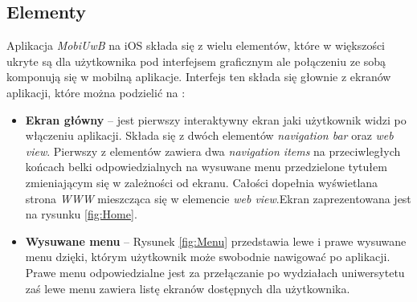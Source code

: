 \documentclass{iiuwb}
\begin{document}
\subsection{Elementy}
Aplikacja \textit{MobiUwB} na iOS składa się z wielu elementów, które w większości ukryte są dla użytkownika pod interfejsem graficznym ale połączeniu ze sobą komponują się w mobilną aplikacje. Interfejs ten składa się głownie z ekranów aplikacji, które można podzielić na :
\begin{itemize}
\item \textbf{Ekran główny} -- jest pierwszy interaktywny ekran jaki użytkownik widzi po włączeniu aplikacji. Składa się z dwóch elementów \textit{navigation bar} oraz \textit{web view}. Pierwszy z elementów zawiera dwa \textit{navigation items} na przeciwległych końcach belki odpowiedzialnych na wysuwane menu przedzielone tytułem zmieniającym się w zależności od ekranu. Całości dopełnia wyświetlana strona \textit{WWW} mieszcząca się w elemencie \textit{web view}.Ekran zaprezentowana jest na rysunku \ref{fig:Home}.
\item \textbf{Wysuwane menu} -- Rysunek \ref{fig:Menu} przedstawia lewe i prawe wysuwane menu dzięki, którym użytkownik może swobodnie nawigować po aplikacji. Prawe menu odpowiedzialne jest za przełączanie po wydziałach uniwersytetu zaś lewe menu zawiera listę ekranów dostępnych dla użytkownika.
\end{itemize}
\end{document}
